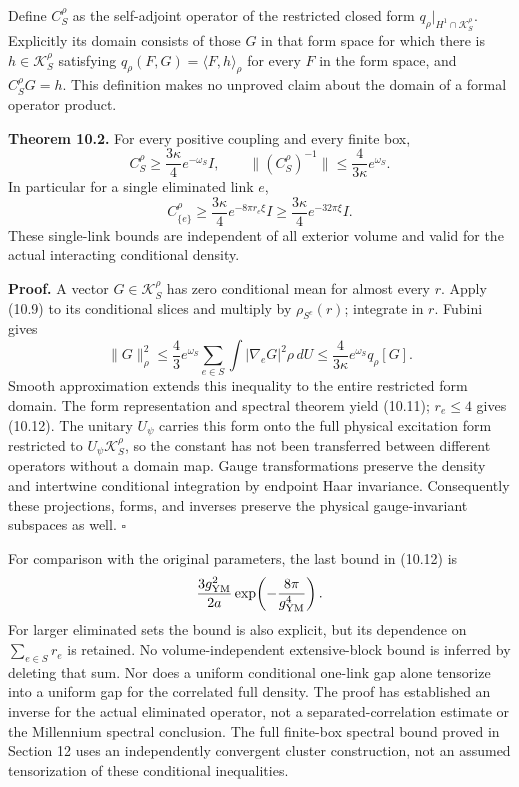 \documentclass[
]{article}
\begin{document}
Define \(C_S^\rho\) as the self-adjoint operator of the restricted
closed form \(q_\rho|_{H^1\cap\mathscr K_S^\rho}\). Explicitly its
domain consists of those \(G\) in that form space for which there is
\(h\in\mathscr K_S^\rho\) satisfying
\(q_\rho(F,G)=\langle F,h\rangle_\rho\) for every \(F\) in the form
space, and \(C_S^\rho G=h\). This definition makes no unproved claim
about the domain of a formal operator product.

\textbf{Theorem 10.2.} For every positive coupling and every finite box,
\[
C_S^\rho\ge\frac{3\kappa}{4}e^{-\omega_S}I,\qquad
\|(C_S^\rho)^{-1}\|\le\frac4{3\kappa}e^{\omega_S}.              \tag{10.11}
\] In particular for a single eliminated link \(e\), \[
C_{\{e\}}^\rho\ge\frac{3\kappa}{4}e^{-8\pi r_e\xi}I
\ge\frac{3\kappa}{4}e^{-32\pi\xi}I.                            \tag{10.12}
\] These single-link bounds are independent of all exterior volume and
valid for the actual interacting conditional density.

\textbf{Proof.} A vector \(G\in\mathscr K_S^\rho\) has zero conditional
mean for almost every \(r\). Apply (10.9) to its conditional slices and
multiply by \(\rho_{S^c}(r)\); integrate in \(r\). Fubini gives \[
\|G\|_\rho^2\le\frac43 e^{\omega_S}
       \sum_{e\in S}\int|\nabla_eG|^2\rho\,dU
\le\frac4{3\kappa}e^{\omega_S}q_\rho[G].
\] Smooth approximation extends this inequality to the entire restricted
form domain. The form representation and spectral theorem yield (10.11);
\(r_e\le4\) gives (10.12). The unitary \(U_\psi\) carries this form onto
the full physical excitation form restricted to
\(U_\psi\mathscr K_S^\rho\), so the constant has not been transferred
between different operators without a domain map. Gauge transformations
preserve the density and intertwine conditional integration by endpoint
Haar invariance. Consequently these projections, forms, and inverses
preserve the physical gauge-invariant subspaces as well. \(\square\)

For comparison with the original parameters, the last bound in (10.12)
is \[
\frac{3g_{\rm YM}^2}{2a}
       \exp\!\left(-\frac{8\pi}{g_{\rm YM}^4}\right).
\] For larger eliminated sets the bound is also explicit, but its
dependence on \(\sum_{e\in S}r_e\) is retained. No volume-independent
extensive-block bound is inferred by deleting that sum. Nor does a
uniform conditional one-link gap alone tensorize into a uniform gap for
the correlated full density. The proof has established an inverse for
the actual eliminated operator, not a separated-correlation estimate or
the Millennium spectral conclusion. The full finite-box spectral bound
proved in Section 12 uses an independently convergent cluster
construction, not an assumed tensorization of these conditional
inequalities.
\end{document}
